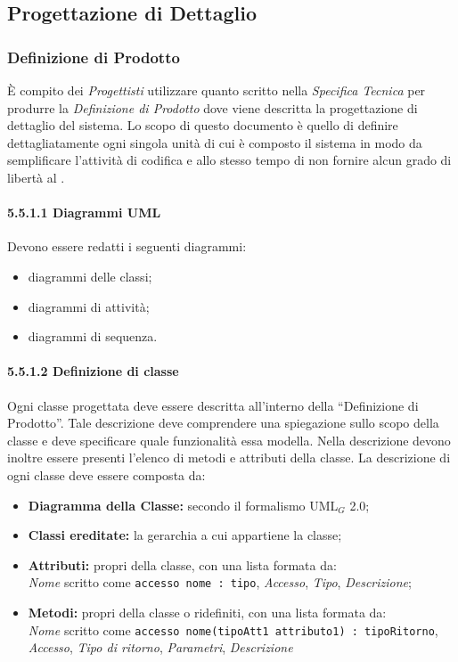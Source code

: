 \subsection{Progettazione di Dettaglio}


\subsubsection{Definizione di Prodotto}
È compito dei \textit{Progettisti} utilizzare quanto scritto nella \textit{Specifica Tecnica} per produrre la \textit{Definizione di Prodotto} dove viene descritta la
progettazione di dettaglio del sistema. Lo scopo di questo documento è quello di definire dettagliatamente ogni singola unità di cui è composto il sistema in modo da semplificare l’attività di codifica e allo stesso tempo di non fornire alcun grado di libertà al \ruoloProgrammatore.

\paragraph{5.5.1.1 Diagrammi UML \\}

Devono essere redatti i seguenti diagrammi:

\begin{itemize}
	\item diagrammi delle classi;
	\item diagrammi di attività;
	\item diagrammi di sequenza.
\end{itemize}

\paragraph{5.5.1.2 Definizione di classe \\}
Ogni classe progettata deve essere descritta all’interno della “Definizione di
Prodotto”. Tale descrizione deve comprendere una spiegazione sullo scopo della classe e
deve specificare quale funzionalità essa modella. Nella descrizione devono inoltre essere
presenti l’elenco di metodi e attributi della classe.
La descrizione di ogni classe deve essere composta da:

\begin{itemize}

\item \textbf{Diagramma della Classe:} secondo il formalismo UML$_G$ 2.0;
\item \textbf{Classi ereditate:} la gerarchia a cui appartiene la classe;
\item \textbf{Attributi:} propri della classe, con una lista formata da: \\ \textit{Nome} scritto come \verb|accesso nome : tipo|, \textit{Accesso}, \textit{Tipo}, \textit{Descrizione};
\item \textbf{Metodi:} propri della classe o ridefiniti, con una lista formata da: \\ \textit{Nome} scritto come \verb|accesso nome(tipoAtt1 attributo1) : tipoRitorno|, \textit{Accesso}, \textit{Tipo di ritorno}, \textit{Parametri}, \textit{Descrizione}
\end{itemize}

